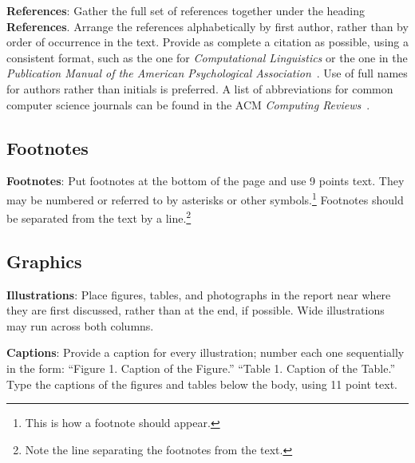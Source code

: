 \documentclass[11pt]{article}
\begin{document}
\textbf{References}: Gather the full set of references together under
the heading {\bf References}. Arrange the references alphabetically
by first author, rather than by order of occurrence in the text.
Provide as complete a citation as possible, using a consistent format,
such as the one for {\em Computational Linguistics\/} or the one in the 
{\em Publication Manual of the American 
Psychological Association\/}~\cite{APA:83}.  Use of full names for
authors rather than initials is preferred.  A list of abbreviations
for common computer science journals can be found in the ACM 
{\em Computing Reviews\/}~\cite{ACM:83}.

\subsection{Footnotes}

{\bf Footnotes}: Put footnotes at the bottom of the page and use 9
points text. They may be numbered or referred to by asterisks or other
symbols.\footnote{This is how a footnote should appear.} Footnotes
should be separated from the text by a line.\footnote{Note the line
separating the footnotes from the text.}

\subsection{Graphics}

{\bf Illustrations}: Place figures, tables, and photographs in the
report near where they are first discussed, rather than at the end, if
possible.  Wide illustrations may run across both columns.

{\bf Captions}: Provide a caption for every illustration; number each one
sequentially in the form:  ``Figure 1. Caption of the Figure.'' ``Table 1.
Caption of the Table.''  Type the captions of the figures and 
tables below the body, using 11 point text.



\end{document}
